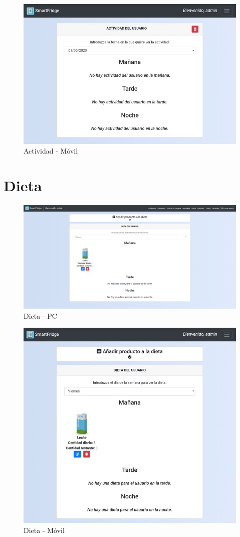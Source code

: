 \begin{figure}[h] 
    \centering
    \includegraphics[width=.50\textwidth]{capitulos/anexotres/Phone/Activity.jpeg}
    \caption{Actividad - Móvil}
    \label{fig:activityphone}
\end{figure}

\newpage
\section{Dieta}
\begin{figure}[h] 
    \centering
    \includegraphics[width=.90\textwidth]{capitulos/anexotres/PC/Diet.png}
    \caption{Dieta - PC}
    \label{fig:dietpc}
\end{figure}

\begin{figure}[h] 
    \centering
    \includegraphics[width=.50\textwidth]{capitulos/anexotres/Phone/Diet.jpeg}
    \caption{Dieta - Móvil}
    \label{fig:dietphone}
\end{figure}

